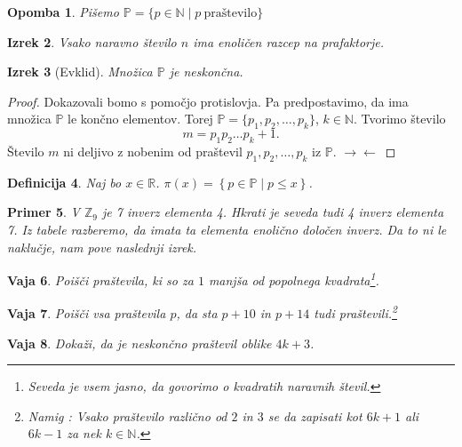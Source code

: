 \documentclass{amsart}
\newcommand{\RR}{\mathbb{R}}
\newcommand{\NN}{\mathbb{N}}
\newcommand{\PP}{\mathbb{P}}
\newcommand{\ZZ}{\mathbb{Z}}
\newtheorem{izrek}{Izrek}[section]
\newtheorem{definicija}[izrek]{Definicija}
\newtheorem{vaja}[izrek]{Vaja}
\newtheorem{opomba}[izrek]{Opomba}
\newtheorem{primer}[izrek]{Primer}
\begin{document}
\begin{opomba}
    Pišemo \(\PP = \{p \in \NN \mid p\ \text{praštevilo}\}\)
\end{opomba}

\begin{izrek}
    Vsako naravno število \(n\) ima enoličen razcep na prafaktorje.
\end{izrek}

\begin{izrek}[Evklid]
    Množica \(\PP\) je neskončna.
\end{izrek}

\begin{proof}
    Dokazovali bomo s pomočjo protislovja. Pa predpostavimo, da ima množica \(\PP\) le končno elementov. Torej
    \(\PP = \{p_1, p_2, \ldots, p_k\}\), \(k \in \NN\). Tvorimo število \[ m = p_1 p_2 \ldots p_k + 1.\]
    Število \(m\) ni deljivo z nobenim od praštevil \(p_1, p_2, \ldots, p_k\) iz \(\PP\). \(\to \gets\)
\end{proof}

\begin{definicija}
    Naj bo $x \in \RR$. $\pi(x) = \left\{p \in \PP \mid p \leq x\right\}$. 
\end{definicija}

\begin{primer}
    V $\ZZ_9$ je 7 inverz elementa 4. Hkrati je seveda tudi 4 inverz elementa 7. Iz tabele razberemo, da imata ta elementa enolično 
    določen inverz. Da to ni le naklučje, nam pove naslednji izrek.
\end{primer}

\begin{vaja}
    Poišči praštevila, ki so za $1$ manjša od popolnega kvadrata\footnote{Seveda je vsem jasno, da govorimo o kvadratih naravnih števil.}. 
\end{vaja}

\begin{vaja}
    Poišči vsa praštevila $p$, da sta $p+10$ in $p+14$ tudi praštevili.\footnote{Namig : 
    Vsako praštevilo različno od $2$ in $3$ se da zapisati kot $6k+1$ ali $6k-1$ za nek $k \in \NN$.}
\end{vaja}

\begin{vaja}
    Dokaži, da je neskončno praštevil oblike $4k+3$.
\end{vaja}

\newpage
\end{document}
